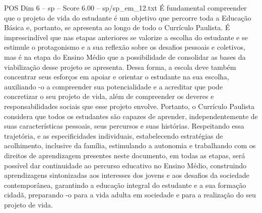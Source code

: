 \begin{textsample}{POS Dim 6 – sp – Score 6.00 – sp/sp\_em\_12.txt}
É fundamental compreender que o projeto de vida do estudante é um objetivo que percorre toda a Educação Básica e, portanto, se apresenta ao longo de todo o Currículo Paulista.
É imprescindível que nas etapas anteriores se valorize a escolha do estudante e se estimule o protagonismo e a sua reflexão sobre os desafios pessoais e coletivos, mas é na etapa do Ensino Médio que a possibilidade de consolidar as bases da viabilização desse projeto se apresenta.
Dessa forma, a escola deve também concentrar seus esforços em apoiar e orientar o estudante na sua escolha, auxiliando -o a compreender sua potencialidade e a acreditar que pode concretizar o seu projeto de vida, além de compreender os deveres e responsabilidades sociais que esse projeto envolve.
Portanto, o Currículo Paulista considera que todos os estudantes são capazes de aprender, independentemente de suas características pessoais, seus percursos e suas histórias.
Respeitando essa trajetória, e as especificidades individuais, estabelecendo estratégias de acolhimento, inclusive da família, estimulando a autonomia e trabalhando com os direitos de aprendizagem presentes neste documento, em todas as etapas, será possível dar continuidade ao percurso educativo no Ensino Médio, construindo aprendizagens sintonizadas aos interesses dos jovens e aos desafios da sociedade contemporânea, garantindo a educação integral do estudante e a sua formação cidadã, preparando -o para a vida adulta em sociedade e para a realização do seu projeto de vida.

\end{textsample}
